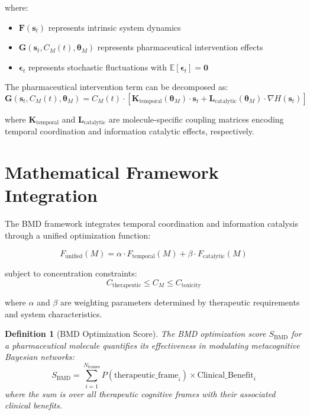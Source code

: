\documentclass[12pt,a4paper]{article}
\newtheorem{definition}{Definition}[section]
\begin{document}
where:
\begin{itemize}
\item $\mathbf{F}(\mathbf{s}_t)$ represents intrinsic system dynamics
\item $\mathbf{G}(\mathbf{s}_t, C_M(t), \boldsymbol{\theta}_M)$ represents pharmaceutical intervention effects
\item $\boldsymbol{\epsilon}_t$ represents stochastic fluctuations with $\mathbb{E}[\boldsymbol{\epsilon}_t] = \mathbf{0}$
\end{itemize}

The pharmaceutical intervention term can be decomposed as:
\begin{equation}
\mathbf{G}(\mathbf{s}_t, C_M(t), \boldsymbol{\theta}_M) = C_M(t) \cdot \left[ \mathbf{K}_{\text{temporal}}(\boldsymbol{\theta}_M) \cdot \mathbf{s}_t + \mathbf{L}_{\text{catalytic}}(\boldsymbol{\theta}_M) \cdot \nabla H(\mathbf{s}_t) \right]
\end{equation}

where $\mathbf{K}_{\text{temporal}}$ and $\mathbf{L}_{\text{catalytic}}$ are molecule-specific coupling matrices encoding temporal coordination and information catalytic effects, respectively.

\section{Mathematical Framework Integration}

The BMD framework integrates temporal coordination and information catalysis through a unified optimization function:

\begin{equation}
F_{\text{unified}}(M) = \alpha \cdot F_{\text{temporal}}(M) + \beta \cdot F_{\text{catalytic}}(M)
\end{equation}

subject to concentration constraints:
\begin{equation}
C_{\text{therapeutic}} \leq C_M \leq C_{\text{toxicity}}
\end{equation}

where $\alpha$ and $\beta$ are weighting parameters determined by therapeutic requirements and system characteristics.

\begin{definition}[BMD Optimization Score]
The BMD optimization score $S_{\text{BMD}}$ for a pharmaceutical molecule quantifies its effectiveness in modulating metacognitive Bayesian networks:
\begin{equation}
S_{\text{BMD}} = \sum_{i=1}^{N_{\text{frames}}} P(\text{therapeutic\_frame}_i) \times \text{Clinical\_Benefit}_i
\end{equation}
where the sum is over all therapeutic cognitive frames with their associated clinical benefits.
\end{definition}
\end{document}
